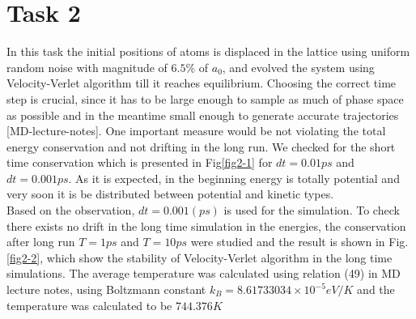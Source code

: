 \section*{Task 2}

In this task the initial positions of atoms is displaced in the lattice using uniform random noise with magnitude of $6.5\%$ of $a_0$, and evolved the system using Velocity-Verlet algorithm till it reaches equilibrium. Choosing the correct time step is crucial, since it has to be large enough to sample as much of phase space as possible and in the meantime small enough to generate accurate trajectories [MD-lecture-notes]. One important measure would be not violating the total energy conservation and not drifting in the long run. We checked for the short time conservation which is presented in Fig\ref{fig2-1} for $dt=0.01ps$ and $dt = 0.001ps$.  As it is expected, in the beginning energy is totally potential and very soon it is be distributed between potential and kinetic types.\\
Based on the observation, $dt=0.001 (ps)$ is used for the simulation. To check there exists no drift in the long time simulation in the energies, the conservation after long run $T=1 ps$ and $T=10 ps$ were studied and the result is shown in Fig.\ref{fig2-2}, which show the stability of Velocity-Verlet algorithm in the long time simulations.
The average temperature was calculated using relation (49) in MD lecture notes, using Boltzmann constant $k_B = 8.61733034\times10^{-5} eV/K$ and the temperature was calculated to be $744.376K$

